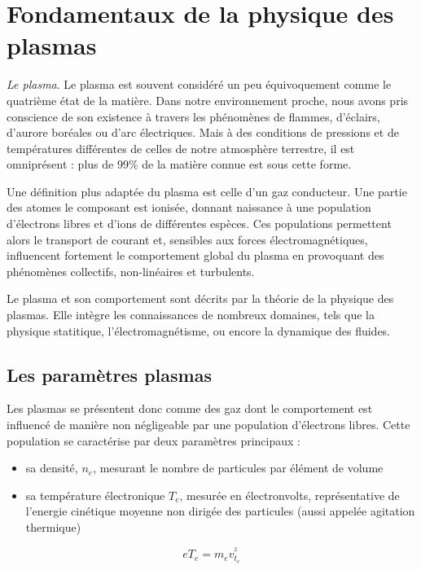 \label{Introduction}
\section{Fondamentaux de la physique des plasmas}

\emph{Le plasma}. Le plasma est souvent considéré un peu équivoquement comme le
quatrième état de la matière. Dans notre environnement proche, nous avons pris
conscience de son existence à travers les phénomènes de flammes, d'éclairs,
d'aurore boréales ou d'arc électriques. Mais à des conditions de pressions et de
températures différentes de celles de notre atmosphère terrestre, il est
omniprésent : plus de 99\% de la matière connue est sous cette forme.

Une définition plus adaptée du plasma est celle d'un gaz conducteur. Une partie
des atomes le composant est ionisée, donnant naissance à une population
d'électrons libres et d'ions de différentes espèces. Ces populations permettent
alors le transport de courant et, sensibles aux forces électromagnétiques,
influencent fortement le comportement global du plasma en provoquant des
phénomènes collectifs, non-linéaires et turbulents.

Le plasma et son comportement sont décrits par la théorie de la physique des
plasmas. Elle intègre les connaissances de nombreux domaines, tels que la
physique statitique, l'électromagnétisme, ou encore la dynamique des fluides.

\subsection{Les paramètres plasmas}
Les plasmas se présentent donc comme des gaz dont le comportement est influencé
de manière non négligeable par une population d'électrons libres. Cette population
se caractérise par deux paramètres principaux :

\begin{itemize}
  \item sa densité, $n_e$, mesurant le nombre de particules par élément de volume
  \item sa température électronique $T_e$, mesurée en électronvolts, représentative
   de l'energie cinétique moyenne non dirigée des particules (aussi appelée agitation thermique)
\end{itemize}

\begin{equation}
	eT_e=m_e v_{t_e}^{^2}
\end{equation}

